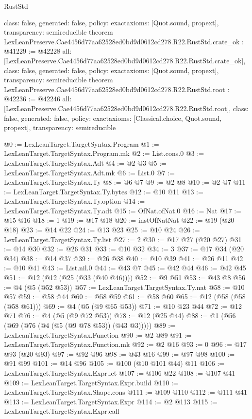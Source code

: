 \begin{lexlean}{RustStd}
\begin{coremodule}
{  class: false,
  generated: false,
  policy: exact{axioms: [Quot.sound, propext]},
  transparency: semireducible
}
theorem LexLeanPreserve.Cae4456d77aa62528ed0bd9d0612cd278.R22.RustStd.crate_ok : @41229 := @42228 {
  all: [LexLeanPreserve.Cae4456d77aa62528ed0bd9d0612cd278.R22.RustStd.crate_ok],
  class: false,
  generated: false,
  policy: exact{axioms: [Quot.sound, propext]},
  transparency: semireducible
}
theorem LexLeanPreserve.Cae4456d77aa62528ed0bd9d0612cd278.R22.RustStd.root : @42236 := @42246 {
  all: [LexLeanPreserve.Cae4456d77aa62528ed0bd9d0612cd278.R22.RustStd.root],
  class: false,
  generated: false,
  policy: exact{axioms: [Classical.choice, Quot.sound, propext]},
  transparency: semireducible
}

@0 := LexLeanTarget.TargetSyntax.Program
@1 := LexLeanTarget.TargetSyntax.Program.mk
@2 := List.cons.{0}
@3 := LexLeanTarget.TargetSyntax.Adt
@4 := @2 @3
@5 := LexLeanTarget.TargetSyntax.Adt.mk
@6 := List.{0}
@7 := LexLeanTarget.TargetSyntax.Ty
@8 := @6 @7
@9 := @2 @8
@10 := @2 @7
@11 := LexLeanTarget.TargetSyntax.Ty.bytes
@12 := @10 @11
@13 := LexLeanTarget.TargetSyntax.Ty.option
@14 := LexLeanTarget.TargetSyntax.Ty.adt
@15 := OfNat.ofNat.{0}
@16 := Nat
@17 := @15 @16
@18 := 1
@19 := @17 @18
@20 := instOfNatNat
@22 := @19 (@20 @18)
@23 := @14 @22
@24 := @13 @23
@25 := @10 @24
@26 := LexLeanTarget.TargetSyntax.Ty.list
@27 := 2
@30 := @17 @27 (@20 @27)
@31 := @14 @30
@32 := @26 @31
@33 := @10 @32
@34 := 3
@37 := @17 @34 (@20 @34)
@38 := @14 @37
@39 := @26 @38
@40 := @10 @39
@41 := @26 @11
@42 := @10 @41
@43 := List.nil.{0}
@44 := @43 @7
@45 := @42 @44
@46 := @42 @45
@51 := @12 (@12 (@25 (@33 (@40 @46))))
@52 := @9 @51
@53 := @43 @8
@56 := @4 (@5 (@52 @53))
@57 := LexLeanTarget.TargetSyntax.Ty.nat
@58 := @10 @57
@59 := @58 @44
@60 := @58 @59
@61 := @58 @60
@65 := @12 (@58 (@58 (@58 @61)))
@69 := @4 (@5 (@9 @65 @53))
@71 := @10 @23 @44
@72 := @12 @71
@76 := @4 (@5 (@9 @72 @53))
@78 := @12 (@25 @44)
@88 := @1 (@56 (@69 (@76 (@4 (@5 (@9 @78 @53)) (@43 @3)))))
@89 := LexLeanTarget.TargetSyntax.Function
@90 := @2 @89
@91 := LexLeanTarget.TargetSyntax.Function.mk
@92 := @2 @16
@93 := 0
@96 := @17 @93 (@20 @93)
@97 := @92 @96
@98 := @43 @16
@99 := @97 @98
@100 := @91 @99
@101 := @14 @96
@105 := @100 (@10 @101 @44) @11
@106 := LexLeanTarget.TargetSyntax.Expr.let
@107 := @106 @22
@108 := @107 @41
@109 := LexLeanTarget.TargetSyntax.Expr.build
@110 := LexLeanTarget.TargetSyntax.Shape.cons
@111 := @109 @110
@112 := @111 @41
@113 := LexLeanTarget.TargetSyntax.Expr
@114 := @2 @113
@115 := LexLeanTarget.TargetSyntax.Expr.call

\end{coremodule}
\end{lexlean}
